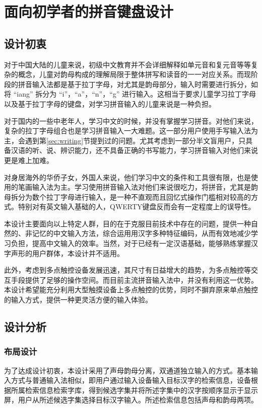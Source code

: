 \chapter{面向初学者的拼音键盘设计}
  \section{设计初衷}

  对于中国大陆的儿童来说，初级中文教育并不会详细解释如单元音和复元音等等复杂的概念，儿童对韵母构成的理解局限于整体拼写和读音的一一对应关系。而现阶段的拼音输入法都是基于拉丁字母，对尤其是韵母部分，输入时需要进行拆分，如将 “iang” 拆分为 “i”，“a”，“n”，“g” 进行输入。这相当于要求儿童学习拉丁字母以及基于拉丁字母的键盘，对学习拼音输入的儿童来说是一种负担。

  对于国内的一些中老年人，学习中文的时候，并没有掌握学习拼音。对他们来说，复杂的拉丁字母组合也是学习拼音输入一大难题。这一部分用户使用手写输入法为主，会遇到第\ref{sec:writing}节提到过的问题。尤其考虑到一部分半文盲用户，只具备汉语的听、说、辨识能力，还不具备正确的书写能力，学习拼音输入对他们来说更是难上加难。

  对身居海外的华侨子女，外国人来说，他们学习中文的条件和工具很有限，也是使用的笔画输入法为主。学习使用拼音输入法对他们来说很吃力，将拼音，尤其是韵母拆分为数个拉丁字母进行输入，是一种不直观而且回忆式操作门槛相对较高的方式。特别对有英文输入基础的人，QWERTY键盘反而会有一定程度上的误导性。

  本设计主要面向以上特定人群，⽬的在于克服目前技术中存在的问题，提供⼀种自然的、⾮记忆的中⽂输⼊方法，综合运⽤用汉字多种特征编码，从⽽有效地减少学习负担，提高中⽂输入的效率。当然，对于已经有一定汉语基础，能够熟练掌握汉字声形的用户群体，本设计并不适用。

  此外，考虑到多点触控设备发展迅速，其尺寸有日益增大的趋势，为多点触控等交互手段提供了足够的操作空间。而目前主流拼音输入法中，并没有利用这一优势。本设计希望能充分利用大型触摸设备上多点触控的优势，同时不摒弃原来单点触控的输入方式，提供一种更灵活方便的输入体验。

  \section{设计分析}
  \subsection{布局设计}

  为了达成设计初衷，本设计采用了声母韵母分离，双通道独立输入的方式。基本输入方式与普通输入法相似，即用户通过输入设备输入目标汉字的检索信息，设备根据所属检索信息检索字库，得到候选字集并将所述字集中的汉字按顺序显示于显示屏，用户从所述候选字集选择目标汉字输入。所述检索信息包括声母和韵母两项。

